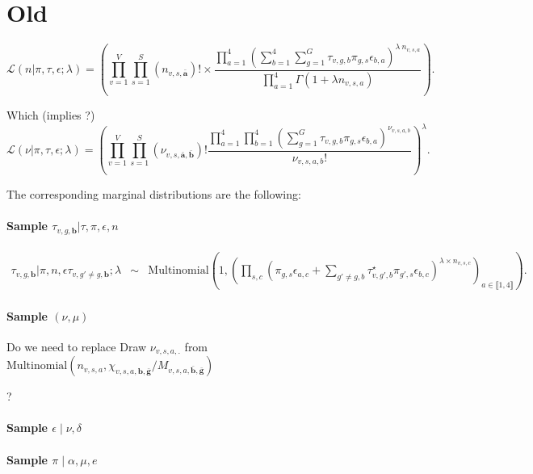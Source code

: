 \documentclass{article}
\newcommand\indexsum[1]{\mathbf{\bar{#1}}}
\newcommand\indexvec[1]{\mathbf{#1}}
\begin{document}
\section{Old}


$$\mathcal{L}\left(n| \pi, \tau,\epsilon;\lambda \right) =\left( \prod_{v=1}^{V} \prod_{s = 1}^{S} (n_{v,s,\indexsum{a}})!\times\frac{\prod_{a = 1}^{4} \left(\sum_{b=1}^{4} \sum_{g = 1}^{G} \tau_{v,g,b} \pi_{g,s} \epsilon_{b,a} \right)^{\lambda~n_{v,s,a}}}{\prod_{a = 1}^{4}\Gamma(1+\lambda n_{v,s,a})}\right). $$

Which (implies ?)
$$\mathcal{L}\left(\nu| \pi, \tau,\epsilon;\lambda \right) =\left( \prod_{v=1}^{V} \prod_{s = 1}^{S} (\nu_{v,s,\indexsum{a},\indexsum{b}})!\frac{\prod_{a=1}^4 \prod_{b=1}^4 \left(\sum_{g=1}^G \tau_{v,g,b} \pi_{g,s} \epsilon_{b,a} \right)^{\nu_{v,s,a,b}}}{\nu_{v,s,a,b}!}\right)^\lambda. $$



The corresponding marginal distributions are the following:

\paragraph*{Sample $\tau_{v,g,\indexvec{b}}|\tau,\pi,\epsilon,n$}
\begin{eqnarray*}
    \tau_{v,g,\indexvec{b}}|\pi,n ,\epsilon \tau_{v,g'\neq g,\indexvec{b}};\lambda&\sim&\mathrm{Multinomial}\left(1,\left(\prod_{s,c}      \left(\pi_{g,s}\epsilon_{a,c}+\sum_{g'\neq g,b}\tau^\star_{v,g',b}\pi_{g',s}\epsilon_{b,c}\right)^{ \lambda\times n_{v,s,c}}\right)_{a\in\llbracket 1,4\rrbracket}\right). 
\end{eqnarray*}


\paragraph*{Sample $(\nu,\mu)$} 
Do we need to replace 
      Draw $\nu_{v,s,a,.}$ from $\mathrm{Multinomial}(n_{v,s,a},\chi_{v,s,a,\indexvec{b},\indexsum{g}}/M_{v,s,a,\indexsum{b},\indexsum{g}})$
     
     ?


\paragraph*{Sample $\epsilon\mid \nu,\delta$} 


\paragraph*{Sample $\pi \mid \alpha,\mu,e$} 
\end{document}
